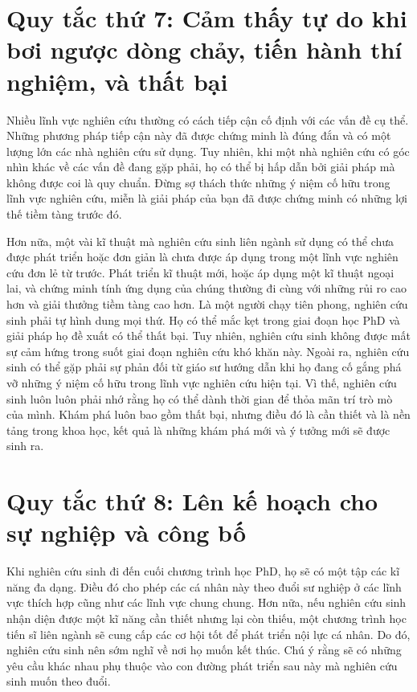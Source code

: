 \documentclass[12pt]{report}
\begin{document}
\section{Quy tắc thứ 7: Cảm thấy tự do khi bơi ngược dòng chảy, tiến hành thí nghiệm, và thất bại}

Nhiều lĩnh vực nghiên cứu thường có cách tiếp cận cố định với các vấn đề cụ thể. Những phương pháp tiếp cận này đã được chứng minh là đúng đắn và có một lượng lớn các nhà nghiên cứu sử dụng. Tuy nhiên, khi một nhà nghiên cứu có góc nhìn khác về các vấn đề đang gặp phải, họ có thể bị hấp dẫn bởi giải pháp mà không được coi là quy chuẩn. Đừng sợ thách thức những ý niệm cố hữu trong lĩnh vực nghiên cứu, miễn là giải pháp của bạn đã được chứng minh có những lợi thế tiềm tàng trước đó.

Hơn nữa, một vài kĩ thuật mà nghiên cứu sinh liên ngành sử dụng có thể chưa được phát triển hoặc đơn giản là chưa được áp dụng trong một lĩnh vực nghiên cứu đơn lẻ từ trước. Phát triển kĩ thuật mới, hoặc áp dụng một kĩ thuật ngoại lai, và chứng minh tính ứng dụng của chúng thường đi cùng với những rủi ro cao hơn và giải thưởng tiềm tàng cao hơn. Là một người chạy tiên phong, nghiên cứu sinh phải tự hình dung mọi thứ. Họ có thể mắc kẹt trong giai đoạn học PhD và giải pháp họ đề xuất có thể thất bại. Tuy nhiên, nghiên cứu sinh không được mất sự cảm hứng trong suốt giai đoạn nghiên cứu khó khăn này. Ngoài ra, nghiên cứu sinh có thể gặp phải sự phản đối từ giáo sư hướng dẫn khi họ đang cố gắng phá vỡ những ý niệm cố hữu trong lĩnh vực nghiên cứu hiện tại. Vì thế, nghiên cứu sinh luôn luôn phải nhớ rằng họ có thể dành thời gian để thỏa mãn trí trò mò của mình. Khám phá luôn bao gồm thất bại, nhưng điều đó là cần thiết và là nền tảng trong khoa học, kết quả là những khám phá mới và ý tưởng mới sẽ được sinh ra.

\section{Quy tắc thứ 8: Lên kế hoạch cho sự nghiệp và công bố}

Khi nghiên cứu sinh đi đến cuối chương trình học PhD, họ sẽ có một tập các kĩ năng đa dạng. Điều đó cho phép các cá nhân này theo đuổi sư nghiệp ở các lĩnh vực thích hợp cũng như các lĩnh vực chung chung. Hơn nữa, nếu nghiên cứu sinh nhận diện được một kĩ năng cần thiết nhưng lại còn thiếu, một chương trình học tiến sĩ liên ngành sẽ cung cấp các cơ hội tốt để phát triển nội lực cá nhân. Do đó, nghiên cứu sinh nên sớm nghĩ về nơi họ muốn kết thúc. Chú ý rằng sẽ có những yêu cầu khác nhau phụ thuộc vào con đường phát triển sau này mà nghiên cứu sinh muốn theo đuổi.
\end{document}
